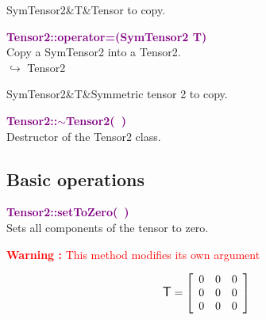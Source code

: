 \begin{tcolorbox}[width=\textwidth,myArgs,tabularx={ll|R},title=Arguments of Tensor2::Tensor2]
SymTensor2&T&Tensor to copy.
\end{tcolorbox}


\textcolor{purple}{\textbf{Tensor2::operator=(SymTensor2 T)}}\label{Tensor2::operator=(SymTensor2 T)}\\
Copy a SymTensor2 into a Tensor2.\\ \hspace*{10mm}$\hookrightarrow$ Tensor2

\begin{tcolorbox}[width=\textwidth,myArgs,tabularx={ll|R},title=Arguments of Tensor2::operator=]
SymTensor2&T&Symmetric tensor 2 to copy.
\end{tcolorbox}


\textcolor{purple}{\textbf{Tensor2::$\sim$Tensor2(~)}}\label{Tensor2::~Tensor2()}\\
Destructor of the Tensor2 class.


\subsection{Basic operations}

\textcolor{purple}{\textbf{Tensor2::setToZero(~)}}\label{Tensor2::setToZero()}\\
Sets all components of the tensor to zero.

\hspace*{10mm}\textcolor{red}{\textbf{Warning :} This method modifies its own argument}

\begin{equation*}
\mbox{\large\ensuremath{\mathsf{T}}}=\left[\begin{array}{ccc}
0&0&0\\
0&0&0\\
0&0&0
\end{array}\right]
\end{equation*}

